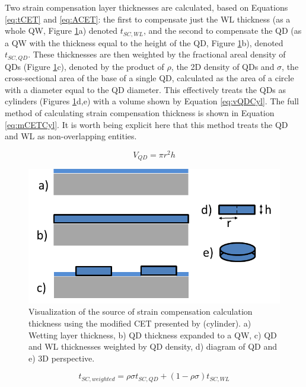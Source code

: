 \documentclass{article}
\begin{document}
Two strain compensation layer thicknesses are calculated, based on Equations \ref{eq:tCET} and \ref{eq:ACET}: the first to compensate just the WL thickness (as a whole QW, Figure \ref{fig:BaileyVol}a) denoted $t_{SC,WL}$, and the second to compensate the QD (as a QW with the thickness equal to the height of the QD, Figure \ref{fig:BaileyVol}b), denoted $t_{SC,QD}$. These thicknesses are then weighted by the fractional areal density of QDs (Figure \ref{fig:BaileyVol}c), denoted by the product of $\rho$, the 2D density of QDs and $\sigma$, the cross-sectional area of the base of a single QD, calculated as the area of a circle with a diameter equal to the QD diameter. This effectively treats the QDs as cylinders (Figures \ref{fig:BaileyVol}d,e) with a volume shown by Equation \ref{eq:vQDCyl}. The full method of calculating strain compensation thickness is shown in Equation \ref{eq:mCETCyl}. It is worth being explicit here that this method treats the QD and WL as non-overlapping entities.

\begin{equation}
\label{eq:vQDCyl}
V_{QD}=\pi r^{2}h
\end{equation}

\begin{figure}
	\includegraphics[width=0.95\linewidth]{QD_Bailey_cyl}
	\centering
	\caption{Visualization of the source of strain compensation calculation thickness using the modified CET presented by \citeauthor{bailey_evaluation_2009} (cylinder). a) Wetting layer thickness, b) QD thickness expanded to a QW, c) QD and WL thicknesses weighted by QD density, d) diagram of QD and e) 3D perspective.}
	\label{fig:BaileyVol}
\end{figure}

\begin{equation}
\label{eq:mCETCyl}
t_{SC,weighted}=\rho\sigma t_{SC,QD}+(1-\rho\sigma)t_{SC,WL}
\end{equation}
\end{document}

